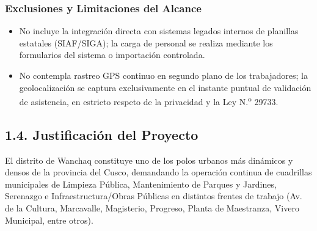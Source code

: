 \documentclass[11pt,a4paper]{article}
\begin{document}
\subsubsection*{Exclusiones y Limitaciones del Alcance}
\begin{itemize}[leftmargin=1.5em, itemsep=0.2em]
    \item No incluye la integración directa con sistemas legados internos de planillas estatales (SIAF/SIGA); la carga de personal se realiza mediante los formularios del sistema o importación controlada.
    \item No contempla rastreo GPS continuo en segundo plano de los trabajadores; la geolocalización se captura exclusivamente en el instante puntual de validación de asistencia, en estricto respeto de la privacidad y la Ley N.\textsuperscript{o} 29733.
\end{itemize}

\subsection*{1.4. Justificación del Proyecto}

El distrito de Wanchaq constituye uno de los polos urbanos más dinámicos y densos de la provincia del Cusco, demandando la operación continua de cuadrillas municipales de Limpieza Pública, Mantenimiento de Parques y Jardines, Serenazgo e Infraestructura/Obras Públicas en distintos frentes de trabajo (Av. de la Cultura, Marcavalle, Magisterio, Progreso, Planta de Maestranza, Vivero Municipal, entre otros).
\end{document}
